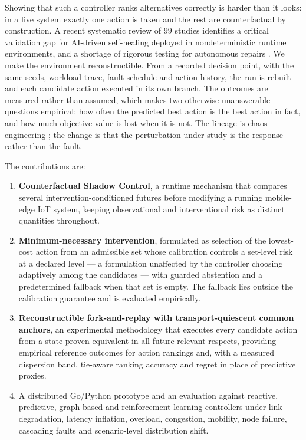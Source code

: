 \documentclass[journal]{IEEEtran}
\begin{document}
Showing that such a controller ranks alternatives correctly is harder than it
looks: in a live system exactly one action is taken and the rest are
counterfactual by construction. A recent systematic review of $99$ studies
identifies a critical validation gap for AI-driven self-healing deployed in
nondeterministic runtime environments, and a shortage of rigorous testing for
autonomous repairs \cite{bonilla2026slr}.%
 We make the environment reconstructible. From a
recorded decision point, with the same seeds, workload trace, fault schedule and
action history, the run is rebuilt and each candidate action executed in its own
branch. The outcomes are measured rather than assumed, which makes two otherwise
unanswerable questions empirical: how often the predicted best action is the
best action in fact, and how much objective value is lost when it is not. The
lineage is chaos engineering \cite{basiri2016chaos}; the change is that the
perturbation under study is the response rather than the fault.

The contributions are:

\begin{enumerate}
\item \textbf{Counterfactual Shadow Control}, a runtime mechanism that compares
several intervention-conditioned futures before modifying a running mobile-edge
IoT system, keeping observational and interventional risk as distinct quantities
throughout.
\item \textbf{Minimum-necessary intervention}, formulated as selection of the
lowest-cost action from an admissible set whose calibration controls a
set-level risk at a declared level --- a formulation unaffected by the
controller choosing adaptively among the candidates --- with guarded abstention
and a predetermined fallback when that set is empty. The fallback lies outside
the calibration guarantee and is evaluated empirically.
\item \textbf{Reconstructible fork-and-replay with transport-quiescent common
anchors}, an experimental methodology that executes every candidate action from
a state proven equivalent in all future-relevant respects, providing empirical
reference outcomes for action rankings and, with a measured dispersion band,
tie-aware ranking accuracy and regret in place of predictive proxies.
\item A distributed Go/Python prototype and an evaluation against reactive,
predictive, graph-based and reinforcement-learning controllers under link
degradation, latency inflation, overload, congestion, mobility, node failure,
cascading faults and scenario-level distribution shift.
\end{enumerate}
\end{document}
